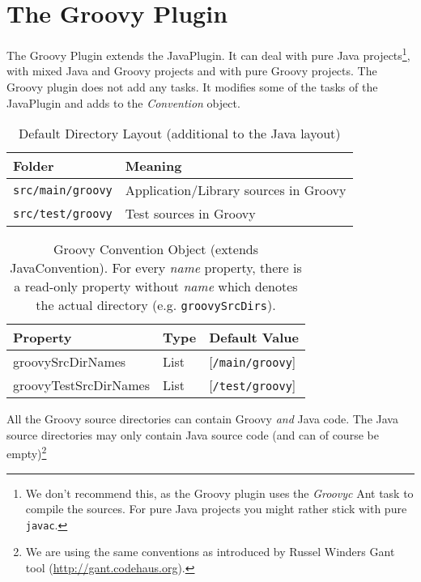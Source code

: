 \chapter{The Groovy Plugin} %
\label{cha:the_groovy_plugin}
The Groovy Plugin extends the JavaPlugin. It can deal with pure Java projects\footnote{We don't recommend this, as the Groovy plugin uses the \emph{Groovyc} Ant task to compile the sources. For pure Java projects you might rather stick with pure \texttt{javac}.}, with mixed Java and Groovy projects and with pure Groovy projects. The Groovy plugin does not add any tasks. It modifies some of the tasks of the JavaPlugin and adds to the \emph{Convention} object.
\begin{table}[h]
	\begin{center}
	\begin{tabular}{|l|l|} \hline
	\textbf{Folder} & \textbf{Meaning} \\ \hline
	\texttt{src/main/groovy} & Application/Library sources in Groovy\\ \hline
	\texttt{src/test/groovy} & Test sources in Groovy \\ \hline
	\end{tabular}
	\end{center}
	\caption{Default Directory Layout (additional to the Java layout)}	
	\label{groovylayout}
\end{table}
\begin{table}[h]
	\begin{center}
		\begin{tabular}{|l|l|l|} \hline
			\textbf{Property} & \textbf{Type} & \textbf{Default Value} \\ \hline
			groovySrcDirNames & List & [\texttt{/main/groovy}] \\ \hline
			groovyTestSrcDirNames & List & [\texttt{/test/groovy}] \\ \hline
		\end{tabular}
	\end{center}
	\caption{Groovy Convention Object (extends JavaConvention). For every \emph{name} property, there is a read-only property without \emph{name} which denotes the actual directory (e.g. \texttt{groovySrcDirs}).}
	\label{groovyconvention}
\end{table}

All the Groovy source directories can contain Groovy \emph{and} Java code. The Java source directories may only contain Java source code (and can of course be empty)\footnote{We are using the same conventions as introduced by Russel Winders Gant tool (\url{http://gant.codehaus.org}).}
